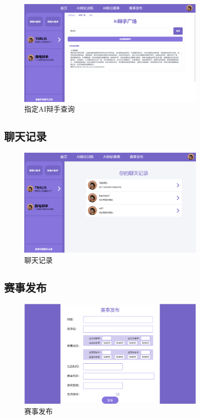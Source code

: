 \documentclass[a4paper,]{article}
\newcommand{\xiaosihao}{\fontsize{12pt}{\baselineskip}\selectfont}
\newcommand{\zw}{\setlength{\baselineskip}{1.5em}\xiaosihao}
\begin{document}
         \begin{figure}[H]
        	\centering
        	\includegraphics[width=0.8\textwidth,height=0.4\textwidth]{AI辩手查询.png}
        	\caption{指定AI辩手查询}
        \end{figure} 
        
        \subsection{聊天记录}
             \zw{我们还为每一次辩论，保留了聊天记录，助力辩手看到自己的成长过程。}
        \begin{figure}[H]
        	\centering
        	\includegraphics[width=0.8\textwidth,height=0.4\textwidth]{聊天记录.png}
        	\caption{聊天记录}
        \end{figure} 
        
         \subsection{赛事发布}
        \zw{我们还简单设计了赛事发布界面，后续赛事将围绕人人对战，人机对战，机机对战，人机团队混合对战等创新辩论模式建设成一个完整的辩论赛事平台。}
        \begin{figure}[H]
        	\centering
        	\includegraphics[width=0.8\textwidth,height=0.4\textwidth]{AI赛事发布.png}
        	\caption{赛事发布}
        \end{figure} 
        
\end{document}
